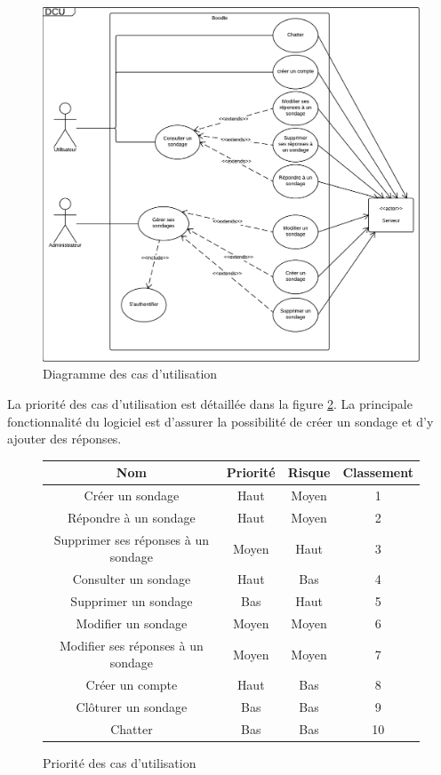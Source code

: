 \documentclass[titlepage]{report}
\begin{document}
\begin{figure}[h]
	\caption{Diagramme des cas d'utilisation}
	\label{diagramme_casDUtilisation}
	\centering
	\includegraphics[width=\textwidth]{figures/diagrammes/casDUtilisation.png}
\end{figure}

\par La priorité des cas d'utilisation est détaillée dans la figure \ref{tableau_casDUtilisation}. La principale fonctionnalité du logiciel est d'assurer la possibilité de créer un sondage et d'y ajouter des réponses.

	\begin{figure}
	\caption{Priorité des cas d'utilisation}
	\label{tableau_casDUtilisation}
	\centering
\begin{tabular}{|c|c|c|c|}
	\hline
	Nom & Priorité & Risque & Classement \\
	\hline
	Créer un sondage & Haut & Moyen & 1 \\
	Répondre à un sondage & Haut & Moyen & 2 \\
	Supprimer ses réponses à un sondage & Moyen & Haut & 3 \\
	Consulter un sondage & Haut & Bas & 4 \\
	Supprimer un sondage & Bas & Haut & 5 \\
	Modifier un sondage & Moyen & Moyen & 6 \\
	Modifier ses réponses à un sondage & Moyen & Moyen & 7 \\
	Créer un compte & Haut & Bas & 8 \\
	Clôturer un sondage & Bas & Bas & 9 \\
	Chatter & Bas & Bas & 10 \\
	\hline
\end{tabular}
\end{figure}
\end{document}
